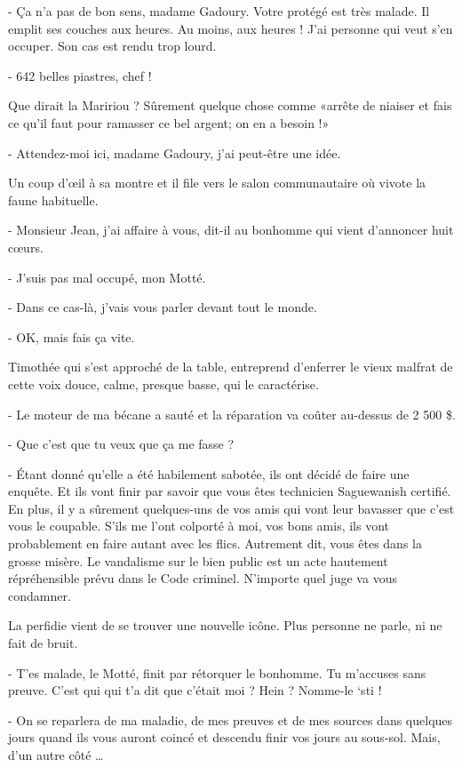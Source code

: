 - Ça n’a pas de bon sens, madame Gadoury. Votre protégé est très malade. Il emplit ses couches aux heures. Au moins, aux heures ! J’ai personne qui veut s’en occuper. Son cas est rendu trop lourd.

- 642 belles piastres, chef !

Que dirait la Maririou ? Sûrement quelque chose comme «arrête de niaiser et fais ce qu’il faut pour ramasser ce bel argent; on en a besoin !»

- Attendez-moi ici, madame Gadoury, j’ai peut-être une idée.

Un coup d’œil à sa montre et il file vers le salon communautaire où vivote la faune habituelle.

- Monsieur Jean, j’ai affaire à vous, dit-il au bonhomme qui vient d’annoncer huit cœurs.

- J’suis pas mal occupé, mon Motté.

- Dans ce cas-là, j’vais vous parler devant tout le monde.

- OK, mais fais ça vite.

Timothée qui s’est approché de la table, entreprend d’enferrer le vieux malfrat de cette voix douce, calme, presque basse, qui le caractérise.

- Le moteur de ma bécane a sauté et la réparation va coûter au-dessus de 2 500 \$.

- Que c’est que tu veux que ça me fasse ?

- Étant donné qu’elle a été habilement sabotée, ils ont décidé de faire une enquête. Et ils vont finir par savoir que vous êtes technicien Saguewanish certifié. En plus, il y a sûrement quelques-uns de vos amis qui vont leur bavasser que c’est vous le coupable. S’ils me l’ont colporté à moi, vos bons amis, ils vont probablement en faire autant avec les flics. Autrement dit, vous êtes dans la grosse misère. Le vandalisme sur le bien public est un acte hautement répréhensible prévu dans le Code criminel. N’importe quel juge va vous condamner.

La perfidie vient de se trouver une nouvelle icône. Plus personne ne parle, ni ne fait de bruit.

- T’es malade, le Motté, finit par rétorquer le bonhomme. Tu m’accuses sans preuve. C’est qui qui t’a dit que c’était moi ? Hein ? Nomme-le ‘sti !

- On se reparlera de ma maladie, de mes preuves et de mes sources dans quelques jours quand ils vous auront coincé et descendu finir vos jours au sous-sol. Mais, d’un autre côté …

